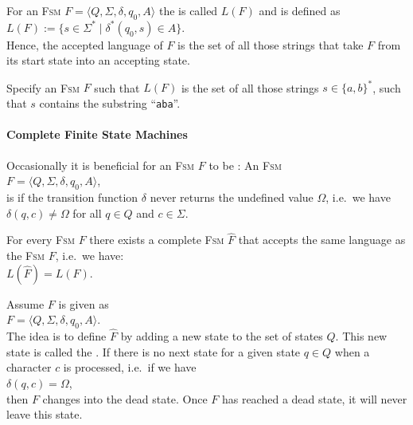 \begin{Definition}
   
  For an \textsc{Fsm} $F = \langle Q, \Sigma, \delta, q_0, A \rangle$ the  
  is called $L(F)$ and is defined as
  \\[0.2cm]
  \hspace*{1.3cm}
  $L(F) := \bigl\{ s \in \Sigma^* \mid \delta^*(q_0,s) \in A \bigr\}$. 
  \\[0.2cm]
  Hence, the accepted language of $F$ is the set of all those strings that take $F$ from its
  start state into an accepting state. \eox
\end{Definition}

\exerciseEng
Specify an \textsc{Fsm} $F$ such that $L(F)$ is the set of all those strings $s \in \{a,b\}^*$, 
such that $s$ contains the substring  ``\texttt{aba}''.
\eox


\paragraph{Complete Finite State Machines}
Occasionally it is beneficial for an \textsc{Fsm} $F$ to be : An \textsc{Fsm}
\\[0.2cm]
\hspace*{1.3cm}
$F = \langle Q, \Sigma, \delta, q_0, A \rangle$,
\\[0.2cm]
is  if the transition function $\delta$ never returns the
undefined value $\Omega$, i.e.~we have 
\\[0.2cm]
\hspace*{1.3cm}
$\delta(q, c) \not= \Omega$ \quad for all $q \in Q$ and $c \in \Sigma$.

\begin{Proposition}
  For every \textsc{Fsm} $F$ there exists a complete \textsc{Fsm}  $\widehat{F}$ that accepts
  the same language as the \textsc{Fsm}  $F$, i.e.~we have:
  \\[0.2cm]
  \hspace*{1.3cm}
  $L(\widehat{F}) = L(F)$.
\end{Proposition}

\proofEng
Assume $F$ is given as
\\[0.2cm]
\hspace*{1.3cm}
$F = \langle Q, \Sigma, \delta, q_0, A \rangle$.
\\[0.2cm]
The idea is to define $\widehat{F}$ by adding a new state to the set of states $Q$.  This new state is called
the  .  If there is no next state for a given state  $q \in Q$ when a character $c$
is processed, i.e.~if we have
\\[0.2cm]
\hspace*{1.3cm}
$\delta(q, c) = \Omega$,
\\[0.2cm]
then $F$ changes into the dead state.  Once $F$ has reached a dead state, it will never leave this
state.

